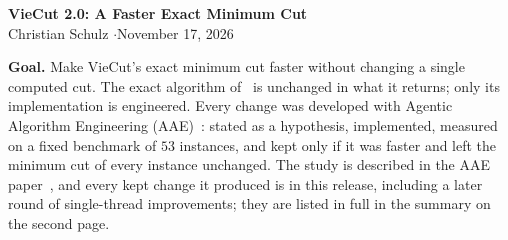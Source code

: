 \documentclass[10pt]{article}
\begin{document}
\begin{center}
  {\Large\bfseries VieCut 2.0: A Faster Exact Minimum Cut}\\[3pt]
  {\normalsize Christian Schulz \quad$\cdot$\quad November 17, 2026}
\end{center}

\vspace{-2pt}
\textbf{Goal.} Make VieCut's exact minimum cut faster without changing a single computed cut. The exact algorithm
of~\cite{henzinger2019} is unchanged in what it returns; only its implementation is engineered. Every change was
developed with Agentic Algorithm Engineering (AAE)~\cite{aae}: stated as a hypothesis, implemented, measured on a
fixed benchmark of $53$ instances, and kept only if it was faster and left the minimum cut of every instance
unchanged. The study is described in the AAE paper~\cite{aae}, and every kept change it produced is in this
release, including a later round of single-thread improvements; they are listed in full in the summary on the
second page.

\begin{center}
\end{center}
\vspace{-6pt}
\end{document}
